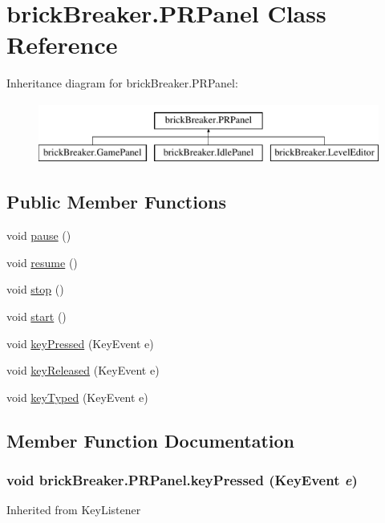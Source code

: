 \hypertarget{classbrick_breaker_1_1_p_r_panel}{
\section{brickBreaker.PRPanel Class Reference}
\label{classbrick_breaker_1_1_p_r_panel}
}
Inheritance diagram for brickBreaker.PRPanel:\begin{figure}[H]
\begin{center}
\leavevmode
\includegraphics[height=2cm]{classbrick_breaker_1_1_p_r_panel}
\end{center}
\end{figure}
\subsection*{Public Member Functions}
\begin{DoxyCompactItemize}
\item 
void \hyperlink{classbrick_breaker_1_1_p_r_panel_a0868e501fc5599973492e6f0c53da920}{pause} ()
\item 
void \hyperlink{classbrick_breaker_1_1_p_r_panel_ac9aadc88543f9032a27f3eb2b8ea908b}{resume} ()
\item 
void \hyperlink{classbrick_breaker_1_1_p_r_panel_ad077fab978f84663f366a6fdde5efe6c}{stop} ()
\item 
void \hyperlink{classbrick_breaker_1_1_p_r_panel_a94e190e70d6aa937068cbf5e8cff523e}{start} ()
\item 
void \hyperlink{classbrick_breaker_1_1_p_r_panel_af86ccc2d42dc48eb03fb6db22e593fc2}{keyPressed} (KeyEvent e)
\item 
void \hyperlink{classbrick_breaker_1_1_p_r_panel_a3485136bec68dd500b98039bd7a87e8e}{keyReleased} (KeyEvent e)
\item 
void \hyperlink{classbrick_breaker_1_1_p_r_panel_a51bdf51ab7141c16101753e4180c970a}{keyTyped} (KeyEvent e)
\end{DoxyCompactItemize}


\subsection{Member Function Documentation}
\hypertarget{classbrick_breaker_1_1_p_r_panel_af86ccc2d42dc48eb03fb6db22e593fc2}{
\subsubsection[{keyPressed}]{\setlength{\rightskip}{0pt plus 5cm}void brickBreaker.PRPanel.keyPressed (KeyEvent {\em e})}}
\label{classbrick_breaker_1_1_p_r_panel_af86ccc2d42dc48eb03fb6db22e593fc2}
Inherited from KeyListener 

